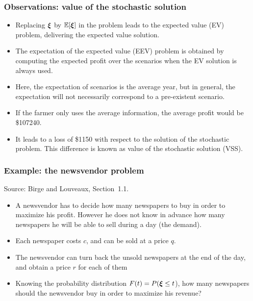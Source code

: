 \documentclass{beamer}
\def\blue{\color{blue}}
\def\red{\color{red}}
\begin{document}
\begin{frame}
\frametitle{Observations: value of the stochastic solution}

\begin{itemize}
\item
Replacing ${\boldsymbol{\xi}}$ by ${\mathbb{E}}[{\boldsymbol{\xi}}]$ in the problem leads to the expected value (EV) problem, delivering the {\blue expected value solution}.
\item
The {\blue expectation of the expected value (EEV)} problem is obtained by computing the expected profit over the scenarios when the EV solution is always used.
\item
Here, the expectation of scenarios is the average year, but in general, the expectation will not necessarily correspond to a pre-existent scenario.
\item
If the farmer only uses the average information, the average profit would be \$107240.
\item
It leads to a loss of \$1150 with respect to the solution of the stochastic problem. This difference is known as {\red value of the stochastic solution (VSS)}.
\end{itemize}

\end{frame}


\begin{frame}
\frametitle{Example: the newsvendor problem}

Source: Birge and Louveaux, Section~1.1.

\mbox{}

\begin{itemize}
	\item
	A newsvendor has to decide how many newspapers to buy in order to maximize his profit.
	However he does not know in advance how many newspapers he will be able to sell during a day (the demand).
	\item
	Each newspaper costs $c$, and can be sold at a price $q$.
	\item
	The newsvendor can turn back the unsold newspapers at the end of the day, and obtain a price $r$ for each of them
	\item
	Knowing the probability distribution $F(t) = P({\boldsymbol{\xi}} \leq t$), how many newspapers should the newsvendor buy in order to maximize his revenue?
\end{itemize}

\end{frame}
\end{document}
